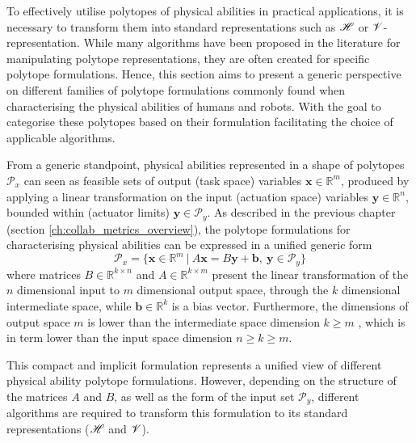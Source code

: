 To effectively utilise polytopes of physical abilities in practical applications, it is necessary to transform them into standard representations such as $\mathscr{H}$ or $\mathscr{V}$-representation. While many algorithms have been proposed in the literature for manipulating polytope representations, they are often created for specific polytope formulations. Hence, this section aims to present a generic perspective on different families of polytope formulations commonly found when characterising the physical abilities of humans and robots. With the goal to categorise these polytopes based on their formulation facilitating the choice of applicable algorithms.

From a generic standpoint, physical abilities represented in a shape of polytopes $\mathcal{P}_x$ can seen as feasible sets of output (task space) variables $\bm{x} \in \mathbb{R}^m$, produced by applying a linear transformation on the input (actuation space) variables $\bm{y} \in \mathbb{R}^n$, bounded within (actuator limits) $\bm{y}\in\mathcal{P}_y$. As described in the previous chapter (section \ref{ch:collab_metrics_overview}), the polytope formulations for characterising physical abilities can be expressed in a unified generic form 
\begin{equation}
    \mathcal{P}_x = \{\bm{x}\in\mathbb{R}^m ~|~ A\bm{x}=B\bm{y} + \bm{b}, ~ \bm{y}\in\mathcal{P}_y\}
    \label{eq:generic_polyt_view_revisit}
\end{equation}
where matrices $B\in\mathbb{R}^{k\times n}$ and $A\in\mathbb{R}^{k\times m}$ present the linear transformation of the $n$ dimensional input to $m$ dimensional output space, through the $k$ dimensional intermediate space, while $\bm{b}\in\mathbb{R}^k$ is a bias vector. Furthermore, the dimensions of output space $m$ is lower than the intermediate space dimension $k\!\geq\! m$ , which is in term lower than the input space dimension $n\!\geq\! k\!\geq\! m$. 

This compact and implicit formulation represents a unified view of different physical ability polytope formulations. However, depending on the structure of the matrices $A$ and $B$, as well as the form of the input set $\mathcal{P}_y$, different algorithms are required to transform this formulation to its standard representations ($\mathscr{H}$ and $\mathscr{V}$). 


